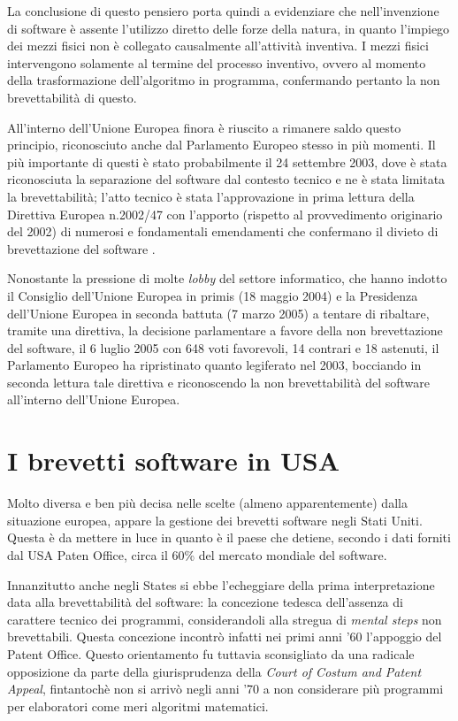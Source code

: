 La conclusione di questo pensiero porta quindi a evidenziare che nell'invenzione di software è assente l'utilizzo diretto delle forze della natura, in quanto l'impiego dei mezzi fisici non è collegato causalmente all'attività inventiva. I mezzi fisici intervengono solamente al termine del processo inventivo, ovvero al momento della trasformazione dell'algoritmo in programma, confermando pertanto la non brevettabilità di questo.

All'interno dell'Unione Europea finora è riuscito a rimanere saldo questo principio, riconosciuto anche dal Parlamento Europeo stesso in più momenti. Il più importante di questi è stato probabilmente il 24 settembre 2003, dove è stata riconosciuta la separazione del software dal contesto tecnico e ne è stata limitata la brevettabilità; l'atto tecnico è stata l'approvazione in prima lettura della Direttiva Europea n.2002/47 con l'apporto (rispetto al provvedimento originario del 2002) di numerosi e fondamentali emendamenti che confermano il divieto di brevettazione del software .

Nonostante la pressione di molte \textit{lobby} del settore informatico, che hanno indotto il Consiglio dell'Unione Europea in primis (18 maggio 2004) e la Presidenza dell'Unione Europea in seconda battuta (7 marzo 2005) a tentare di ribaltare, tramite una direttiva, la decisione parlamentare a favore della non brevettazione del software, il 6 luglio 2005 con 648 voti favorevoli, 14 contrari e 18 astenuti, il Parlamento Europeo ha ripristinato quanto legiferato nel 2003, bocciando in seconda lettura tale direttiva e riconoscendo la non brevettabilità del software all'interno dell'Unione Europea.

\section{I brevetti software in USA}

Molto diversa e ben più decisa nelle scelte (almeno apparentemente) dalla situazione europea, appare la gestione dei brevetti software negli Stati Uniti. Questa è da mettere in luce in quanto è il paese che detiene, secondo i dati forniti dal USA Paten Office, circa il 60\% del mercato mondiale del software.

Innanzitutto anche negli States si ebbe l'echeggiare della prima interpretazione data alla brevettabilità del software: la concezione tedesca dell'assenza di carattere tecnico dei programmi, considerandoli alla stregua di \textit{mental steps} non brevettabili. Questa concezione incontrò infatti nei primi anni '60 l'appoggio del Patent Office. Questo orientamento fu tuttavia sconsigliato da una radicale opposizione da parte della giurisprudenza della \textit{Court of Costum and Patent Appeal}, fintantochè non si arrivò negli anni '70 a non considerare più programmi per elaboratori come meri algoritmi matematici.

